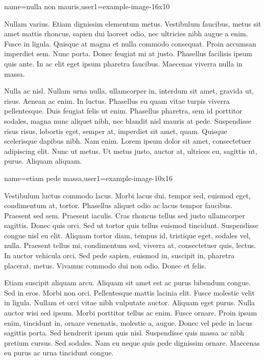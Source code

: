 %
{name={nulla non mauris},user1={example-image-16x10}}%
{%
Nullam varius. Etiam dignissim elementum metus. Vestibulum faucibus,
metus sit amet mattis rhoncus, sapien dui laoreet odio, nec
ultricies nibh augue a enim. Fusce in ligula. Quisque at magna et
nulla commodo consequat.  Proin accumsan imperdiet sem. Nunc porta.
Donec feugiat mi at justo.  Phasellus facilisis ipsum quis ante. In
ac elit eget ipsum pharetra faucibus.  Maecenas viverra nulla in
massa.

Nulla ac nisl. Nullam urna nulla, ullamcorper in, interdum sit amet,
gravida ut, risus. Aenean ac enim. In luctus.  Phasellus eu quam
vitae turpis viverra pellentesque. Duis feugiat felis ut enim.
Phasellus pharetra, sem id porttitor sodales, magna nunc aliquet
nibh, nec blandit nisl mauris at pede. Suspendisse risus risus,
lobortis eget, semper at, imperdiet sit amet, quam.  Quisque
scelerisque dapibus nibh. Nam enim. Lorem ipsum dolor sit amet,
consectetuer adipiscing elit. Nunc ut metus. Ut metus justo, auctor
at, ultrices eu, sagittis ut, purus. Aliquam aliquam.
}

%
{name={etiam pede massa},user1={example-image-10x16}}%
{%
Vestibulum luctus commodo lacus. Morbi lacus dui, tempor sed,
euismod eget, condimentum at, tortor. Phasellus aliquet odio ac
lacus tempor faucibus. Praesent sed sem. Praesent iaculis.  Cras
rhoncus tellus sed justo ullamcorper sagittis.  Donec quis orci.
Sed ut tortor quis tellus euismod tincidunt. Suspendisse congue nisl
eu elit. Aliquam tortor diam, tempus id, tristique eget, sodales
vel, nulla. Praesent tellus mi, condimentum sed, viverra at,
consectetuer quis, lectus. In auctor vehicula orci. Sed pede sapien,
euismod in, suscipit in, pharetra placerat, metus. Vivamus commodo
dui non odio. Donec et felis.

Etiam suscipit aliquam arcu. Aliquam sit amet est ac purus bibendum
congue. Sed in eros. Morbi non orci.  Pellentesque mattis lacinia
elit. Fusce molestie velit in ligula.  Nullam et orci vitae nibh
vulputate auctor. Aliquam eget purus.  Nulla auctor wisi sed ipsum.
Morbi porttitor tellus ac enim. Fusce ornare. Proin ipsum enim,
tincidunt in, ornare venenatis, molestie a, augue. Donec vel pede in
lacus sagittis porta. Sed hendrerit ipsum quis nisl.  Suspendisse
quis massa ac nibh pretium cursus.  Sed sodales. Nam eu neque quis
pede dignissim ornare. Maecenas eu purus ac urna tincidunt congue.
}

